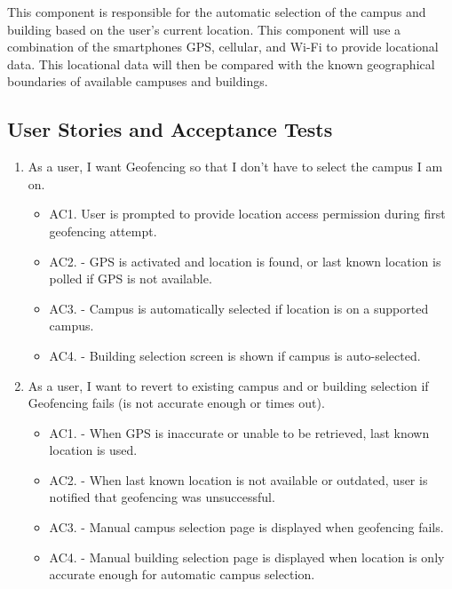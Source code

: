 \documentclass{scrreprt}
\begin{document}
This component is responsible for the automatic selection of the campus and building based on the user’s current location. This component will use a combination of the smartphones GPS, cellular, and Wi-Fi to provide locational data. This locational data will then be compared with the known geographical boundaries of available campuses and buildings.


\subsection{User Stories and Acceptance Tests}

\begin{enumerate}
	\item As a user, I want Geofencing so that I don't have to select the campus I am on.
	
		\begin{itemize}
			\item AC1. User is prompted to provide location access permission during first geofencing attempt.
			\item AC2. - GPS is activated and location is found, or last known location is polled if GPS is not available.
			\item AC3. - Campus is automatically selected if location is on a supported campus.
			\item AC4. - Building selection screen is shown if campus is auto-selected.

		\end{itemize}
	
	\item As a user, I want to revert to existing campus and or building selection if Geofencing fails (is not accurate enough or times out).
	
		\begin{itemize}
			\item AC1. - When GPS is inaccurate or unable to be retrieved, last known location is used.
			
			\item AC2. - When last known location is not available or outdated, user is notified that geofencing was unsuccessful.
			
			\item AC3. - Manual campus selection page is displayed when geofencing fails.
			
			\item AC4. - Manual building selection page is displayed when location is only accurate enough for automatic campus selection.
		\end{itemize}
\end{enumerate}
\end{document}
